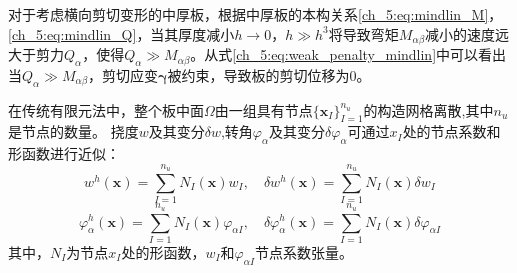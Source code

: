 对于考虑横向剪切变形的中厚板，根据中厚板的本构关系\eqref{ch_5:eq:mindlin_M}，\eqref{ch_5:eq:mindlin_Q}，当其厚度减小$h\rightarrow 0$，$h \gg h^3$将导致弯矩$M_{\alpha \beta}$减小的速度远大于剪力$Q_{\alpha}$，使得$Q_{\alpha}\gg M_{\alpha \beta}$。从式\eqref{ch_5:eq:weak_penalty_mindlin}中可以看出当$Q_{\alpha}\gg M_{\alpha \beta}$，剪切应变$\boldsymbol{\gamma}$被约束，导致板的剪切位移为$0$。

在传统有限元法中，整个板中面$\Omega$由一组具有节点$\{\boldsymbol x_I\}_{I=1}^{n_u}$的构造网格离散,其中$n_u$是节点的数量。
挠度$w$及其变分$\delta w $,转角$\varphi_\alpha$及其变分$\delta \varphi_\alpha $可通过$x_I$处的节点系数和形函数进行近似：
\begin{equation}\label{ch_5:eq:w_h}
    w^h(\boldsymbol x) = \sum_{I=1}^{n_u} N_I(\boldsymbol x) w_I, \quad \delta w^h(\boldsymbol x) = \sum_{I=1}^{n_u} N_I(\boldsymbol x) \delta w_I
\end{equation}
\begin{equation}\label{ch_5:eq:varphi_h}
    \varphi^h_{\alpha}(\boldsymbol x) = \sum_{I=1}^{n_u} N_I(\boldsymbol x) \varphi_{\alpha I}, \quad \delta \varphi^h_{\alpha}(\boldsymbol x) = \sum_{I=1}^{n_u} N_I(\boldsymbol x) \delta \varphi_{\alpha I}
\end{equation}
其中，$N_I$为节点$x_I$处的形函数，$w_I$和$\varphi_{\alpha I}$节点系数张量。


